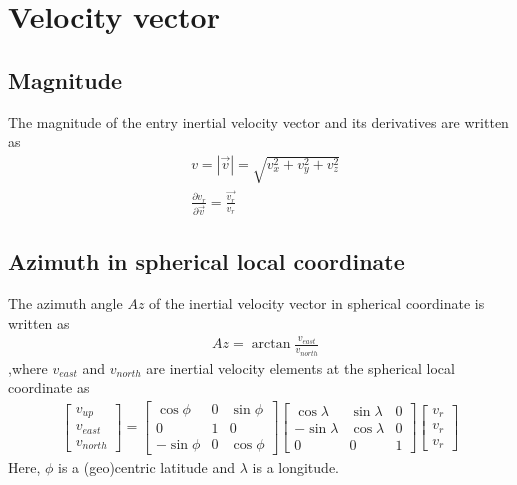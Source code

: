 \documentclass[11pt]{article}
\begin{document}
\section{Velocity vector}
\subsection{Magnitude}
The magnitude of the entry inertial velocity vector and its derivatives are written as
\begin{equation}
	\label{eq:velocity_magnitude}
	\begin{aligned}
		&v = \left|\vec{v}\right| = \sqrt{v_{x}^{2}+v_{y}^{2}+v_{z}^{2}}\\
		&\frac{\partial{v_r}}{\partial{\vec{v}}} = \frac{\vec{v_{r}}}{v_r}
	\end{aligned}
\end{equation}


\subsection{Azimuth in spherical local coordinate}\label{Azimuth}
The azimuth angle $Az$ of the inertial velocity vector in spherical coordinate is written as
\begin{equation}
	\label{eq:velocity_Az}
	\begin{aligned}
		&Az = \arctan{\frac{v_{east}}{v_{north}}}
	\end{aligned}
\end{equation}
,where $v_{east}$ and $v_{north}$ are inertial velocity elements at the spherical local coordinate as
\begin{equation}
	\label{eq:velocity_local}
	\begin{aligned}
		\begin{bmatrix}
		v_{up}\\
		v_{east}\\
		v_{north}
		\end{bmatrix} =
		\begin{bmatrix}
		\cos{\phi} & 0 & \sin{\phi}\\
		0 & 1 & 0\\
		-\sin{\phi} & 0 & \cos{\phi}
		\end{bmatrix}
		\begin{bmatrix}
		\cos{\lambda} & \sin{\lambda} & 0\\
		-\sin{\lambda}& \cos{\lambda} & 0\\
		0 & 0 & 1
		\end{bmatrix}
		\begin{bmatrix}
		v_{r}\\
		v_{r}\\
		v_{r}
		\end{bmatrix}
	\end{aligned}
\end{equation}
Here, $\phi$ is a (geo)centric latitude and $\lambda$ is a longitude.
\end{document}

